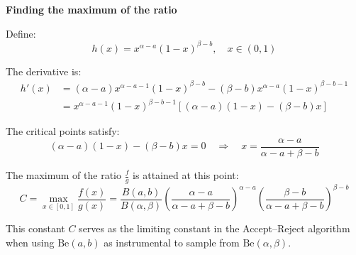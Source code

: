 \vspace{1em}
\textbf{Finding the maximum of the ratio}

Define:
\begin{equation}
h(x) = x^{\alpha - a} (1 - x)^{\beta - b}, \quad x \in (0,1)
\end{equation}

The derivative is:
\begin{align}
h'(x) &= (\alpha - a) x^{\alpha - a - 1} (1 - x)^{\beta - b} - (\beta - b) x^{\alpha - a} (1 - x)^{\beta - b - 1} \\
&= x^{\alpha - a - 1} (1 - x)^{\beta - b - 1} \left[ (\alpha - a)(1 - x) - (\beta - b) x \right]
\end{align}

The critical points satisfy:
\begin{equation}
(\alpha - a)(1 - x) - (\beta - b) x = 0 \quad \Rightarrow \quad x = \frac{\alpha - a}{\alpha - a + \beta - b}
\end{equation}

The maximum of the ratio \(\frac{f}{g}\) is attained at this point:
\[
C = \max_{x \in [0,1]} \frac{f(x)}{g(x)} = \frac{B(a, b)}{B(\alpha, \beta)} \left( \frac{\alpha - a}{\alpha - a + \beta - b} \right)^{\alpha - a} \left( \frac{\beta - b}{\alpha - a + \beta - b} \right)^{\beta - b}
\]

This constant \(C\) serves as the limiting constant in the Accept–Reject algorithm when using \(\text{Be}(a,b)\) as instrumental to sample from \(\text{Be}(\alpha, \beta)\).











